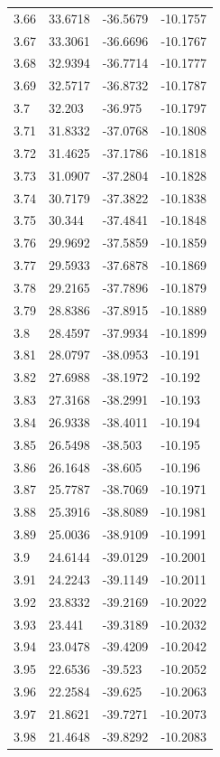 \begin{tabular}{llll}
3.66 & 33.6718 & -36.5679 & -10.1757 \\
3.67 & 33.3061 & -36.6696 & -10.1767 \\
3.68 & 32.9394 & -36.7714 & -10.1777 \\
3.69 & 32.5717 & -36.8732 & -10.1787 \\
3.7 & 32.203 & -36.975 & -10.1797 \\
3.71 & 31.8332 & -37.0768 & -10.1808 \\
3.72 & 31.4625 & -37.1786 & -10.1818 \\
3.73 & 31.0907 & -37.2804 & -10.1828 \\
3.74 & 30.7179 & -37.3822 & -10.1838 \\
3.75 & 30.344 & -37.4841 & -10.1848 \\
3.76 & 29.9692 & -37.5859 & -10.1859 \\
3.77 & 29.5933 & -37.6878 & -10.1869 \\
3.78 & 29.2165 & -37.7896 & -10.1879 \\
3.79 & 28.8386 & -37.8915 & -10.1889 \\
3.8 & 28.4597 & -37.9934 & -10.1899 \\
3.81 & 28.0797 & -38.0953 & -10.191 \\
3.82 & 27.6988 & -38.1972 & -10.192 \\
3.83 & 27.3168 & -38.2991 & -10.193 \\
3.84 & 26.9338 & -38.4011 & -10.194 \\
3.85 & 26.5498 & -38.503 & -10.195 \\
3.86 & 26.1648 & -38.605 & -10.196 \\
3.87 & 25.7787 & -38.7069 & -10.1971 \\
3.88 & 25.3916 & -38.8089 & -10.1981 \\
3.89 & 25.0036 & -38.9109 & -10.1991 \\
3.9 & 24.6144 & -39.0129 & -10.2001 \\
3.91 & 24.2243 & -39.1149 & -10.2011 \\
3.92 & 23.8332 & -39.2169 & -10.2022 \\
3.93 & 23.441 & -39.3189 & -10.2032 \\
3.94 & 23.0478 & -39.4209 & -10.2042 \\
3.95 & 22.6536 & -39.523 & -10.2052 \\
3.96 & 22.2584 & -39.625 & -10.2063 \\
3.97 & 21.8621 & -39.7271 & -10.2073 \\
3.98 & 21.4648 & -39.8292 & -10.2083 \\

\end{tabular}
